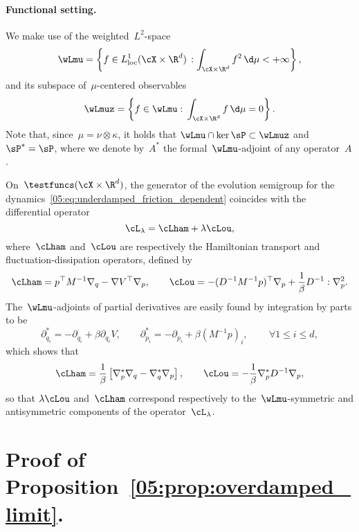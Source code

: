 \paragraph{Functional setting.}
We make use of the weighted~$L^2$-space
\begin{equation}    
    \wLmu = \left\{f\in L^1_{\mathrm{loc}}(\cX\times\R^d)\,: \int_{\cX\times \R^d}f^2 \,\d \mu < +\infty\right\},
\end{equation}
and its subspace of~$\mu$-centered observables
\begin{equation}
    \wLmuz = \left\{f\in \wLmu:\,\int_{\cX\times\R^d}f\,\d\mu = 0\right\}.
\end{equation}
Note that, since~$\mu = \nu\otimes\kappa$, it holds that $\wLmu\cap\ker\sP \subset \wLmuz$ and~$\sP^*=\sP$, where we denote by~$A^*$ the formal~$\wLmu$-adjoint of any operator~$A$.

On~$\testfuncs(\cX\times\R^d)$, the generator of the evolution semigroup for the dynamics~\eqref{05:eq:underdamped_friction_dependent} coincides with the differential operator
\begin{equation}
    \cL_\lambda = \cLham + \lambda \cLou,
\end{equation}
where~$\cLham$ and~$\cLou$ are respectively the Hamiltonian transport and fluctuation-dissipation operators, defined by
\begin{equation}
    \cLham = p^\top M^{-1}\nabla_q - \nabla V^\top\nabla_p,\qquad\cLou = -(D^{-1}M^{-1}p)^\top\nabla_p + \frac1\beta D^{-1}:\nabla_p^2.
\end{equation}
The~$\wLmu$-adjoints of partial derivatives are easily found by integration by parts to be
\begin{equation}
    \partial_{q_i}^* = -\partial_{q_i}+\beta\partial_{q_i}V,\qquad \partial_{p_i}^* = -\partial_{p_i}+\beta (M^{-1}p)_i,\qquad\,\forall 1\leq i\leq d,
\end{equation}
which shows that
\begin{equation}
    \cLham = \frac1\beta\left[\nabla_p^{*}\nabla_q-\nabla_q^{*}\nabla_p\right],\qquad \cLou =-\frac1\beta \nabla_p^{*}D^{-1}\nabla_p,
\end{equation}
so that $\lambda\cLou$ and~$\cLham$ correspond respectively to the~$\wLmu$-symmetric and antisymmetric components of the operator~$\cL_\lambda$.

\section{Proof of Proposition~\ref{05:prop:overdamped_limit}.}

